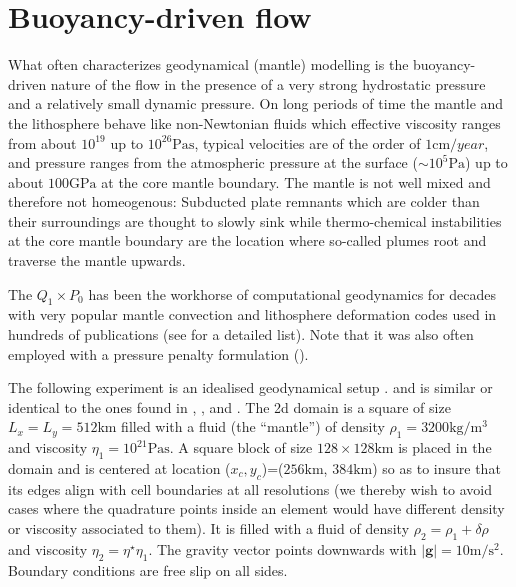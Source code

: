 \documentclass[a4paper,12pt]{article}
\begin{document}
\section{Buoyancy-driven flow}



What often characterizes geodynamical (mantle) modelling is the buoyancy-driven nature of the flow 
in the presence of a very strong hydrostatic pressure and a relatively small dynamic pressure.
On long periods of time the mantle and the lithosphere behave like non-Newtonian fluids
which effective viscosity ranges from about $10^{19}$ up to $10^{26}\si{\pascal\second}$, 
typical velocities are of the order of $1\si{\cm\per year}$, and pressure ranges from 
the atmospheric pressure at the surface ($\sim 10^5 \si{\pascal}$) up to about $100\si{\giga\pascal}$ 
at the core mantle boundary. The mantle is not well mixed and therefore not homeogenous: 
Subducted plate remnants which are colder than their surroundings are thought to slowly sink 
while thermo-chemical instabilities at the core mantle boundary are the location where 
so-called plumes root and traverse the mantle upwards.

The $Q_1\times P_0$ has been the workhorse of computational geodynamics for decades with 
very popular mantle convection and lithosphere deformation codes used in hundreds of publications
(see \cite{thba22} for a detailed list).
Note that it was also often employed with a pressure penalty formulation (\cite{kirh90,full95,brtf08}).

The following experiment is an idealised geodynamical setup \cite{thba22,thba25}.
and is similar or identical to the ones found in \cite{mamo08}, \cite{gery10}, \cite{thie11} 
and \cite{sctc20}.
The 2d domain is a square of size $L_x=L_y=512$km filled with a fluid (the ``mantle'')
of density $\rho_1=3200\si{\kg\per\cubic\metre}$ 
and viscosity $\eta_1=10^{21}\si{\pascal\second}$.
A square block of size $128\times 128\si{\km}$ is placed in the domain and
is centered at location ($x_c,y_c$)=($256\si{\km}$, $384\si{\km}$) so 
as to insure that its edges
align with cell boundaries at all resolutions (we thereby wish to avoid
cases where the quadrature points inside an element would have different
density or viscosity associated to them). It is filled with a fluid
of density $\rho_2=\rho_1+\delta \rho$ and viscosity $\eta_2=\eta^\star \eta_1$.
The gravity vector points downwards with $|{\bm g}|=10\si{\metre\per\square\second}$. 
Boundary conditions are free slip on all sides.
\end{document}
